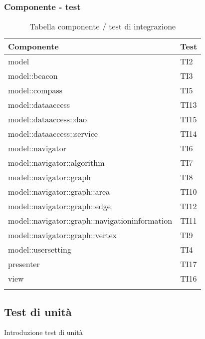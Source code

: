 \documentclass[../PianoDiQualifica.tex]{subfiles}
\begin{document}
\begin{appendices}
\subsubsection{Componente - test}

\begin{longtabu} to \textwidth{X X}
\toprule
\textbf{Componente} & \textbf{Test}\\
\midrule
\endhead
{}
model & TI2 \\ 
\midrule 
model::beacon & TI3 \\ 
\midrule 
model::compass & TI5 \\ 
\midrule 
model::dataaccess & TI13 \\ 
\midrule 
model::dataaccess::dao & TI15 \\ 
\midrule 
model::dataaccess::service & TI14 \\ 
\midrule 
model::navigator & TI6 \\ 
\midrule 
model::navigator::algorithm & TI7 \\ 
\midrule 
model::navigator::graph & TI8 \\ 
\midrule 
model::navigator::graph::area & TI10 \\ 
\midrule 
model::navigator::graph::edge & TI12 \\ 
\midrule 
model::navigator::graph::navigationinformation & TI11 \\ 
\midrule 
model::navigator::graph::vertex & TI9 \\ 
\midrule 
model::usersetting & TI4 \\ 
\midrule 
presenter & TI17 \\ 
\midrule 
view & TI16 \\ 
\bottomrule
\caption{Tabella componente / test di integrazione} \\
\end{longtabu}

\subsection{Test di unità}
	Introduzione test di unità
	

\end{appendices}
\end{document}
